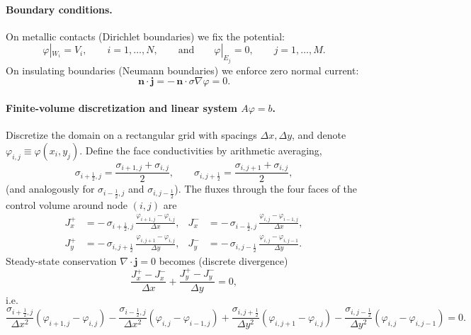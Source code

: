 \documentclass[aps, prb, superscriptaddress, longbibliography]{revtex4-2}
\renewcommand{\phi}{\varphi}
\numberwithin{equation}{section}
\begin{document}
    \paragraph{Boundary conditions.}
    On metallic contacts (Dirichlet boundaries) we fix the potential:
    \begin{equation}
    \phi|_{W_i}=V_i, \qquad i=1,\dots,N,
    \qquad\text{and}\qquad
    \phi|_{E_j}=0, \qquad j=1,\dots,M.
    \label{eq:dirichlet}
    \end{equation}
    On insulating boundaries (Neumann boundaries) we enforce zero normal current:
    \begin{equation}
    \mathbf n\cdot \mathbf j = -\,\mathbf n\cdot \sigma\nabla\phi = 0.
    \label{eq:neumann}
    \end{equation}
    
    \paragraph{Finite-volume discretization and linear system $A\phi=b$.}
    Discretize the domain on a rectangular grid with spacings $\Delta x,\Delta y$,
    and denote $\phi_{i,j}\equiv \phi(x_i,y_j)$.
    Define the face conductivities by arithmetic averaging,
    \begin{equation}
    \sigma_{i+\frac12,j}=\frac{\sigma_{i+1,j}+\sigma_{i,j}}{2},
    \qquad
    \sigma_{i,j+\frac12}=\frac{\sigma_{i,j+1}+\sigma_{i,j}}{2},
    \label{eq:sigfaces}
    \end{equation}
    (and analogously for $\sigma_{i-\frac12,j}$ and $\sigma_{i,j-\frac12}$).
    The fluxes through the four faces of the control volume around node $(i,j)$ are
    \begin{align}
    J_x^{+} &= -\,\sigma_{i+\frac12,j}\,\frac{\phi_{i+1,j}-\phi_{i,j}}{\Delta x},&
    J_x^{-} &= -\,\sigma_{i-\frac12,j}\,\frac{\phi_{i,j}-\phi_{i-1,j}}{\Delta x}, \\
    J_y^{+} &= -\,\sigma_{i,j+\frac12}\,\frac{\phi_{i,j+1}-\phi_{i,j}}{\Delta y},&
    J_y^{-} &= -\,\sigma_{i,j-\frac12}\,\frac{\phi_{i,j}-\phi_{i,j-1}}{\Delta y}.
    \label{eq:fluxes}
    \end{align}
    Steady-state conservation $\nabla\cdot \mathbf j=0$ becomes (discrete divergence)
    \begin{equation}
    \frac{J_x^{+}-J_x^{-}}{\Delta x}+\frac{J_y^{+}-J_y^{-}}{\Delta y}=0,
    \label{eq:discdiv}
    \end{equation}
    i.e.
    \begin{equation}
    \frac{\sigma_{i+\frac12,j}}{\Delta x^{2}}\!\left(\phi_{i+1,j}-\phi_{i,j}\right)
    -\frac{\sigma_{i-\frac12,j}}{\Delta x^{2}}\!\left(\phi_{i,j}-\phi_{i-1,j}\right)
    +\frac{\sigma_{i,j+\frac12}}{\Delta y^{2}}\!\left(\phi_{i,j+1}-\phi_{i,j}\right)
    -\frac{\sigma_{i,j-\frac12}}{\Delta y^{2}}\!\left(\phi_{i,j}-\phi_{i,j-1}\right)=0.
    \label{eq:stencil}
    \end{equation}
\end{document}
